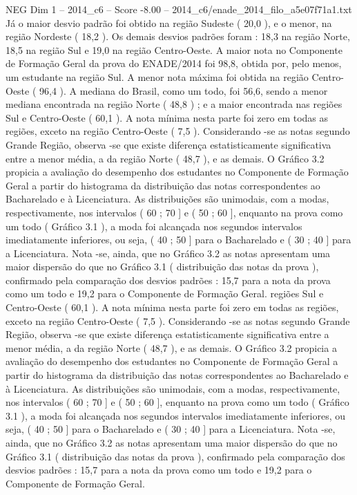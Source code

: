 \begin{textsample}{NEG Dim 1 – 2014\_c6 – Score -8.00 – 2014\_c6/enade\_2014\_filo\_a5e07f71a1.txt}
Já o maior desvio padrão foi obtido na região Sudeste ( 20,0 ), e o menor, na região Nordeste ( 18,2 ).
Os demais desvios padrões foram : 18,3 na região Norte, 18,5 na região Sul e 19,0 na região Centro-Oeste.
A maior nota no Componente de Formação Geral da prova do ENADE/2014 foi 98,8, obtida por, pelo menos, um estudante na região Sul.
A menor nota máxima foi obtida na região Centro-Oeste ( 96,4 ).
A mediana do Brasil, como um todo, foi 56,6, sendo a menor mediana encontrada na região Norte ( 48,8 ) ; e a maior encontrada nas regiões Sul e Centro-Oeste ( 60,1 ).
A nota mínima nesta parte foi zero em todas as regiões, exceto na região Centro-Oeste ( 7,5 ).
Considerando -se as notas segundo Grande Região, observa -se que existe diferença estatisticamente significativa entre a menor média, a da região Norte ( 48,7 ), e as demais.
O Gráfico 3.2 propicia a avaliação do desempenho dos estudantes no Componente de Formação Geral a partir do histograma da distribuição das notas correspondentes ao Bacharelado e à Licenciatura.
As distribuições são unimodais, com a modas, respectivamente, nos intervalos ( 60 ; 70 ] e ( 50 ; 60 ], enquanto na prova como um todo ( Gráfico 3.1 ), a moda foi alcançada nos segundos intervalos imediatamente inferiores, ou seja, ( 40 ; 50 ] para o Bacharelado e ( 30 ; 40 ] para a Licenciatura.
Nota -se, ainda, que no Gráfico 3.2 as notas apresentam uma maior dispersão do que no Gráfico 3.1 ( distribuição das notas da prova ), confirmado pela comparação dos desvios padrões : 15,7 para a nota da prova como um todo e 19,2 para o Componente de Formação Geral. regiões Sul e Centro-Oeste ( 60,1 ).
A nota mínima nesta parte foi zero em todas as regiões, exceto na região Centro-Oeste ( 7,5 ).
Considerando -se as notas segundo Grande Região, observa -se que existe diferença estatisticamente significativa entre a menor média, a da região Norte ( 48,7 ), e as demais.
O Gráfico 3.2 propicia a avaliação do desempenho dos estudantes no Componente de Formação Geral a partir do histograma da distribuição das notas correspondentes ao Bacharelado e à Licenciatura.
As distribuições são unimodais, com a modas, respectivamente, nos intervalos ( 60 ; 70 ] e ( 50 ; 60 ], enquanto na prova como um todo ( Gráfico 3.1 ), a moda foi alcançada nos segundos intervalos imediatamente inferiores, ou seja, ( 40 ; 50 ] para o Bacharelado e ( 30 ; 40 ] para a Licenciatura.
Nota -se, ainda, que no Gráfico 3.2 as notas apresentam uma maior dispersão do que no Gráfico 3.1 ( distribuição das notas da prova ), confirmado pela comparação dos desvios padrões : 15,7 para a nota da prova como um todo e 19,2 para o Componente de Formação Geral.

\end{textsample}
